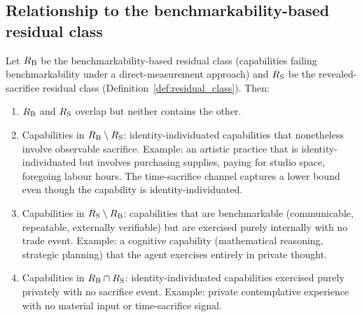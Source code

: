 \subsection{Relationship to the benchmarkability-based residual class}

\begin{proposition}
\label{prop:residual_intersection}
Let $R_{\mathrm{B}}$ be the benchmarkability-based residual class
(capabilities failing benchmarkability under a direct-measurement
approach) and $R_{\mathrm{S}}$ be the revealed-sacrifice residual class
(Definition~\ref{def:residual_class}).  Then:
\begin{enumerate}
\item[(a)] $R_{\mathrm{B}}$ and $R_{\mathrm{S}}$ overlap but neither contains the
  other.
\item[(b)] Capabilities in $R_{\mathrm{B}} \setminus R_{\mathrm{S}}$:
  identity-individuated capabilities that nonetheless involve
  observable sacrifice.  Example: an artistic practice that is
  identity-individuated but involves purchasing supplies, paying
  for studio space, foregoing labour hours.  The time-sacrifice
  channel captures a lower bound even though the capability is
  identity-individuated.
\item[(c)] Capabilities in $R_{\mathrm{S}} \setminus R_{\mathrm{B}}$: capabilities
  that are benchmarkable (communicable, repeatable, externally
  verifiable) but are exercised purely internally with no trade
  event.  Example: a cognitive capability (mathematical reasoning,
  strategic planning) that the agent exercises entirely in private
  thought.
\item[(d)] Capabilities in $R_{\mathrm{B}} \cap R_{\mathrm{S}}$:
  identity-individuated capabilities exercised purely privately
  with no sacrifice event.  Example: private contemplative
  experience with no material input or time-sacrifice signal.
\end{enumerate}
\end{proposition}

